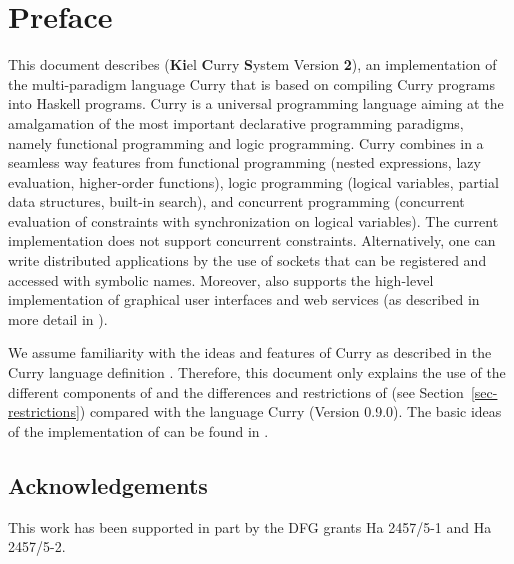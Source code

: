 \section*{Preface}

This document describes \CYS (\textbf{Ki}el \textbf{C}urry \textbf{S}ystem
Version \textbf{2}),
an implementation of the multi-paradigm language Curry
\cite{Hanus97POPL,Hanus15Curry} that is
based on compiling Curry programs into Haskell programs.
Curry is a universal programming language aiming at the amalgamation
of the most important declarative programming paradigms,
namely functional programming and logic programming.
Curry combines in a seamless way features from functional programming
(nested expressions, lazy evaluation, higher-order functions),
logic programming (logical variables, partial data structures,
built-in search), and concurrent programming (concurrent evaluation
of constraints with synchronization on logical variables).
The current \CYS implementation does not support concurrent
constraints. Alternatively, one can write distributed applications
by the use of sockets that can be registered and accessed
with symbolic names.
Moreover, \CYS also supports
the high-level implementation of
graphical user interfaces and web services
(as described in more detail in
\cite{Hanus99PPDP,Hanus00PADL,Hanus01PADL,Hanus06PPDP}).

We assume familiarity with the ideas and features
of Curry as described in the Curry language definition \cite{Hanus15Curry}.
Therefore, this document only explains the use of the different
components of \CYS
and the differences and restrictions of \CYS
(see Section~\ref{sec-restrictions})
compared with the language Curry (Version 0.9.0).
%
The basic ideas of the implementation of \CYS
can be found in
\cite{BrasselHanusPeemoellerReck11,BrasselHanusPeemoellerReck11WLP}.

\bigskip

\subsection*{Acknowledgements}

This work has been supported in part by the
DFG grants Ha 2457/5-1 and Ha 2457/5-2.
